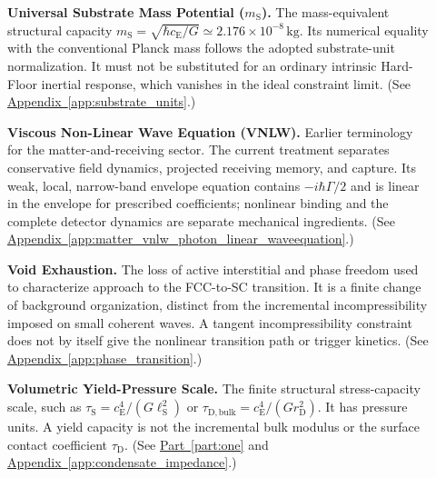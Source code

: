 \begin{description}
\item[] \begin{minipage}[t]{\linewidth}
\textbf{Universal Substrate Mass Potential ($m_{\mathrm S}$).} The mass-equivalent structural capacity $m_{\mathrm S}=\sqrt{\hbar c_{\mathrm E}/G}\simeq2.176\times10^{-8}\,\mathrm{kg}$. Its numerical equality with the conventional Planck mass follows the adopted substrate-unit normalization. It must not be substituted for an ordinary intrinsic Hard-Floor inertial response, which vanishes in the ideal constraint limit.
(See \hyperref[app:substrate_units]{Appendix~\ref*{app:substrate_units}}.)
\end{minipage}

\item[] \begin{minipage}[t]{\linewidth}
\textbf{Viscous Non-Linear Wave Equation (VNLW).} Earlier terminology for the matter-and-receiving sector. The current treatment separates conservative field dynamics, projected receiving memory, and capture. Its weak, local, narrow-band envelope equation contains $-i\hbar\Gamma/2$ and is linear in the envelope for prescribed coefficients; nonlinear binding and the complete detector dynamics are separate mechanical ingredients.
(See \hyperref[app:matter_vnlw_photon_linear_waveequation]{Appendix~\ref*{app:matter_vnlw_photon_linear_waveequation}}.)
\end{minipage}

\item[] \begin{minipage}[t]{\linewidth}
\textbf{Void Exhaustion.} The loss of active interstitial and phase freedom used to characterize approach to the FCC-to-SC transition. It is a finite change of background organization, distinct from the incremental incompressibility imposed on small coherent waves. A tangent incompressibility constraint does not by itself give the nonlinear transition path or trigger kinetics.
(See \hyperref[app:phase_transition]{Appendix~\ref*{app:phase_transition}}.)
\end{minipage}

\item[] \begin{minipage}[t]{\linewidth}
\textbf{Volumetric Yield-Pressure Scale.} The finite structural stress-capacity scale, such as $\tau_{\mathrm S}=c_{\mathrm E}^4/(G\ell_{\mathrm S}^2)$ or $\tau_{\mathrm D,\mathrm{bulk}}=c_{\mathrm E}^4/(Gr_{\mathrm D}^2)$. It has pressure units. A yield capacity is not the incremental bulk modulus or the surface contact coefficient $\tau_{\mathrm D}$.
(See \hyperref[part:one]{Part~\ref*{part:one}} and \hyperref[app:condensate_impedance]{Appendix~\ref*{app:condensate_impedance}}.)
\end{minipage}


\end{description}
